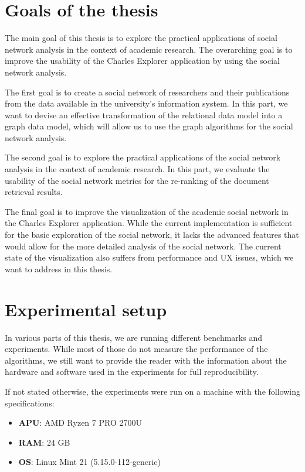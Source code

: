 \section*{Goals of the thesis}

The main goal of this thesis is to explore the practical applications of social network analysis 
in the context of academic research. The overarching goal is to improve the usability
of the Charles Explorer application by using the social network analysis.

The first goal is to create a social network of researchers and their publications from the data available in the university's information system.
In this part, we want to devise an effective transformation of the relational data model into a graph data model, 
which will allow us to use the graph algorithms for the social network analysis.

The second goal is to explore the practical applications of the social network analysis in the context of academic research.
In this part, we evaluate the usability of the social network metrics for the re-ranking of the document retrieval results.

The final goal is to improve the visualization of the academic social network in the Charles Explorer application.
While the current implementation is sufficient for the basic exploration of the social network, 
it lacks the advanced features that would allow for the more detailed analysis of the social network.
The current state of the visualization also suffers from performance and UX issues, which we want to address in this thesis.

\section*{Experimental setup}

In various parts of this thesis, we are running different benchmarks and experiments.
While most of those do not measure the performance of the algorithms, we still want to 
provide the reader with the information about the hardware and software used in the experiments for full reproducibility.

If not stated otherwise, the experiments were run on a machine with the following specifications:
\begin{itemize}
    \item \textbf{APU}: AMD Ryzen 7 PRO 2700U
    \item \textbf{RAM}: 24 GB
    \item \textbf{OS}: Linux Mint 21 (5.15.0-112-generic)
\end{itemize}

